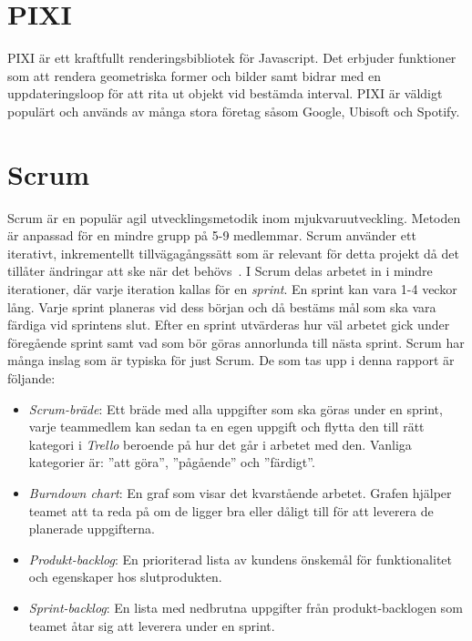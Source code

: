 \section{PIXI}
PIXI är ett kraftfullt renderingsbibliotek för Javascript. Det erbjuder funktioner som att rendera geometriska former och bilder samt bidrar med en uppdateringsloop för att rita ut objekt vid bestämda interval. PIXI är väldigt populärt och används av många stora företag såsom Google, Ubisoft och Spotify.~\cite{Pixi}

\section{Scrum}
\label{theory:scrum}
Scrum är en populär agil utvecklingsmetodik inom mjukvaruutveckling. Metoden är anpassad för en mindre grupp på 5-9 medlemmar. Scrum använder ett iterativt, inkrementellt tillvägagångssätt som är relevant för detta projekt då det tillåter ändringar att ske när det behövs~\cite{TheScrum}. I Scrum delas arbetet in i mindre iterationer, där varje iteration kallas för en \textit{sprint}. En sprint kan vara 1-4 veckor lång. Varje sprint planeras vid dess början och då bestäms mål som ska vara färdiga vid sprintens slut. Efter en sprint utvärderas hur väl arbetet gick under föregående sprint samt vad som bör göras annorlunda till nästa sprint. Scrum har många inslag som är typiska för just Scrum. De som tas upp i denna rapport är följande:

\begin{itemize}
	\item \textit{Scrum-bräde}: Ett bräde med alla uppgifter som ska göras under en sprint, varje teammedlem kan sedan ta en egen uppgift och flytta den till rätt kategori i \textit{Trello} beroende på hur det går i arbetet med den. Vanliga kategorier är: ''att göra'', ''pågående'' och ''färdigt''.

	\item \textit{Burndown chart}: En graf som visar det kvarstående arbetet. Grafen hjälper teamet att ta reda på om de ligger bra eller dåligt till för att leverera de planerade uppgifterna.

	\item \textit{Produkt-backlog}: En prioriterad lista av kundens önskemål för funktionalitet och egenskaper hos slutprodukten.

	\item \textit{Sprint-backlog}: En lista med nedbrutna uppgifter från produkt-backlogen som teamet åtar sig att leverera under en sprint.

\end{itemize}

